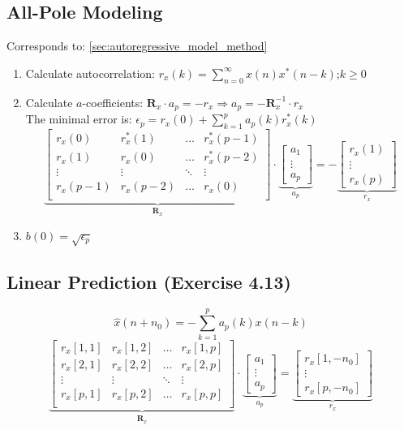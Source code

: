 \subsection{All-Pole Modeling }
Corresponds to: \ref{sec:autoregressive_model_method}
\begin{enumerate}
	\item Calculate autocorrelation: $ r_x(k) = \sum\limits_{n=0}^\infty x(n)x^*(n-k)$;\qquad $k\geq 0$
	\item Calculate $a$-coefficients: $\bm R_x \cdot a_p = -r_x \Longrightarrow a_p = - \bm R_x^{-1} \cdot r_x$
  		\small\\
		The minimal error is: $\epsilon_{p} = r_x(0) + \sum\limits_{k=1}^p a_p(k) r_x^*(k)$
			$$
		\underbrace{\begin{bmatrix}
    		r_x(0) & r_x^*(1) & \hdots & r_x^*(p-1) \\
    		r_x(1) & r_x(0) & \hdots & r_x^*(p-2) \\
    		\vdots & \vdots & \ddots & \vdots \\
    		r_x(p-1) & r_x(p-2) & \hdots & r_x(0) \\
		\end{bmatrix}  }_{\bm R_x} \cdot
		\underbrace{\begin{bmatrix}
    		a_1 \\
    		\vdots \\
    		a_p
		\end{bmatrix}  }_{a_p}= -\underbrace{\begin{bmatrix}
    		r_x(1) \\
    		\vdots \\
    		r_x(p)
		\end{bmatrix}  }_{r_x}$$
	\item $b(0) = \sqrt{\epsilon_p}$
\end{enumerate}


\subsection{Linear Prediction  (Exercise 4.13)}

		$$\hat{x}(n+n_0) = - \sum\limits_{k=1}^p a_p(k) x(n-k)$$
		$$
		\underbrace{\begin{bmatrix}
    		r_x[1,1] & r_x[1,2] & \hdots & r_x[1,p] \\
    		r_x[2,1] & r_x[2,2] & \hdots & r_x[2,p] \\
    		\vdots & \vdots & \ddots & \vdots \\
    		r_x[p,1] & r_x[p,2] & \hdots & r_x[p,p] \\
		\end{bmatrix}  }_{\bm R_x} \cdot
		\underbrace{\begin{bmatrix}
    		a_1 \\
    		\vdots \\
    		a_p
		\end{bmatrix}  }_{a_p}= \underbrace{\begin{bmatrix}
    		r_x[1,-n_0] \\
    		\vdots \\
    		r_x[p,-n_0]
		\end{bmatrix}  }_{r_x}$$

